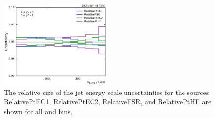 \begin{figure}[htbp]
    \includegraphics[width=0.49\textwidth]{figures/measurement/jec_relunc_3_yb2ys0.pdf}
    \caption[Split-up of JEC uncertainty sources: Part IV] {The relative size of the jet energy scale
             uncertainties for the sources RelativePtEC1, RelativePtEC2,
             RelativeFSR, and RelativePtHF are shown for all \ystar and \yboost bins.}

    \label{fig:jec_relunc_3}
\end{figure}

